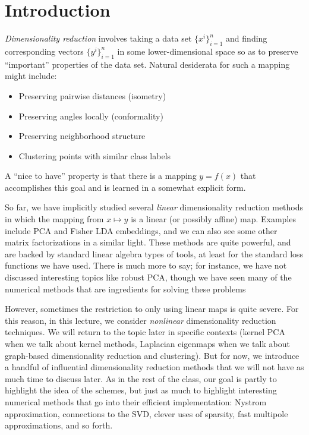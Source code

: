 \documentclass[12pt, leqno]{article} %
\begin{document}

\section{Introduction}


{\em Dimensionality reduction} involves taking a data set
$\{x^i\}_{i=1}^n$ and finding corresponding vectors $\{y^i\}_{i=1}^n$
in some lower-dimensional space so as to preserve ``important''
properties of the data set.  Natural desiderata for such a mapping
might include:
\begin{itemize}
  \item Preserving pairwise distances (isometry)
  \item Preserving angles locally (conformality)
  \item Preserving neighborhood structure
  \item Clustering points with similar class labels
\end{itemize}
A ``nice to have'' property is that there is a mapping $y = f(x)$ that
accomplishes this goal and is learned in a somewhat explicit form.

So far, we have implicitly studied several {\em linear} dimensionality
reduction methods in which the mapping from $x \mapsto y$ is a linear
(or possibly affine) map.  Examples include PCA and Fisher LDA
embeddings, and we can also see some other matrix factorizations in a
similar light.  These methods are quite powerful, and are backed by
standard linear algebra types of tools, at least for the standard loss
functions we have used.  There is much more to say; for instance, we
have not discussed interesting topics like robust PCA, though we have
seen many of the numerical methods that are ingredients for solving
these problems

However, sometimes the restriction to only using linear maps is quite
severe.  For this reason, in this lecture, we consider {\em nonlinear}
dimensionality reduction techniques.  We will return to the topic
later in specific contexts (kernel PCA when we talk about kernel
methods, Laplacian eigenmaps when we talk about graph-based
dimensionality reduction and clustering).  But for now, we introduce a
handful of influential dimensionality reduction methods that we will
not have as much time to discuss later.  As in the rest of the class,
our goal is partly to highlight the idea of the schemes, but just as
much to highlight interesting numerical methods that go into their
efficient implementation: Nystrom approximation, connections to the
SVD, clever uses of sparsity, fast multipole approximations, and so
forth.
\end{document}
